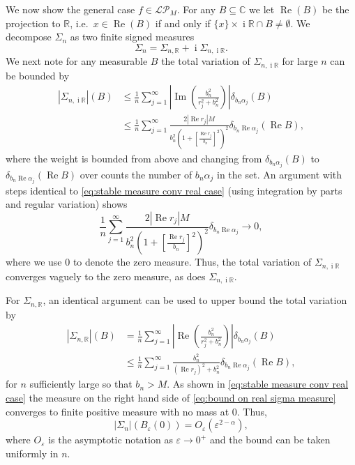 \documentclass[reqno]{amsart}
\newcommand{\1}{\mathbf{1}}
\DeclareMathOperator{\ii}{i}
\newcommand{\C}{\mathbb{C}}
\renewcommand\Re{\operatorname{Re}}
\renewcommand\Im{\operatorname{Im}}
\newcommand{\eps}{\varepsilon}
\newcommand{\R}{\mathbb{R}}
\def\R{\mathbb{R}}
\newcommand{\LP}{\mathcal{LP}}
\theoremstyle{plain}
\theoremstyle{definition}
\theoremstyle{remark}
\numberwithin{equation}{section}
\begin{document}
	 We now show the general case $f\in\LP_{M}$. For any $B\subseteq\C$ we let $\Re(B)$ be the projection to $\R$, i.e.\ $x\in\Re(B)$ if and only if $\{x\}\times\ii\R\cap B\neq \emptyset$. We decompose $\Sigma_{n}$ as two finite signed measures \begin{equation*}
	 	\Sigma_{n}=\Sigma_{n,\R}+\ii\Sigma_{n,\ii\R}.
	 \end{equation*} We next note for any measurable $B$ the total variation of $\Sigma_{n,\ii\R}$ for large $n$ can be bounded by  \begin{equation}
	\begin{aligned}
			 |\Sigma_{n,\ii\R}|(B)&\le \frac{1}{n}\sum_{j=1}^{\infty}\left|\Im\left(\frac{b_n^2}{r_j^2+b_n^2}\right)\right|\delta_{b_n\alpha_{j}}(B)\\
			 &\leq \frac{1}{n}\sum_{j=1}^{\infty}\frac{2|\Re r_{j}|M}{b_{n}^2\left(1+\left[\frac{\Re r_j}{b_n}\right]^2\right)^2 }\delta_{b_n\Re\alpha_{j}}(\Re B ),
	\end{aligned}
	 \end{equation} where the weight is bounded from above and changing from $\delta_{b_n\alpha_{j}}(B)$ to $\delta_{b_n\Re\alpha_{j}}(\Re B )$ over counts the number of $b_n\alpha_{j}$ in the set. An argument with steps identical to \eqref{eq:stable measure conv real case} (using integration by parts and regular variation) shows \begin{equation}
	  \frac{1}{n}\sum_{j=1}^{\infty}\frac{2|\Re r_{j}|M}{b_{n}^2\left(1+\left[\frac{\Re r_j}{b_n}\right]^2\right)^2 }\delta_{b_n\Re\alpha_{j}}\rightarrow0,
	 \end{equation} where we use $0$ to denote the zero measure. Thus, the total variation of $\Sigma_{n,\ii\R}$ converges vaguely to the zero measure, as does $\Sigma_{n,\ii\R}$. 
	 
	 For $\Sigma_{n,\R}$, an identical argument can be used to upper bound  the total variation by \begin{equation}\label{eq:bound on real sigma measure}
	 	\begin{aligned}
	 		|\Sigma_{n,\R}|(B)&= \frac{1}{n}\sum_{j=1}^{\infty}\left|\Re\left(\frac{b_n^2}{r_j^2+b_n^2}\right)\right|\delta_{b_n\alpha_{j}}(B)\\
	 		&\leq \frac{1}{n}\sum_{j=1}^{\infty}\frac{b_n^2}{(\Re r_j)^2+b_n^2}\delta_{b_n\Re \alpha_j}\left(\Re B\right),
	 	\end{aligned}
	 \end{equation} for $n$ sufficiently large so that $b_n>M$. As shown in \eqref{eq:stable measure conv real case} the measure on the right hand side of \eqref{eq:bound on real sigma measure} converges to finite positive measure with no mass at $0$. Thus, \begin{equation}\label{eq:near 0 Sigma bound}
	 |\Sigma_{n}|(B_{\eps}(0))=O_{\eps}\left(\eps^{2-\alpha}\right),
	 \end{equation} where $O_{\eps}$ is the asymptotic notation as $\eps\rightarrow0^{+}$ and the bound can be taken uniformly in $n$. 
	 
\end{document}
